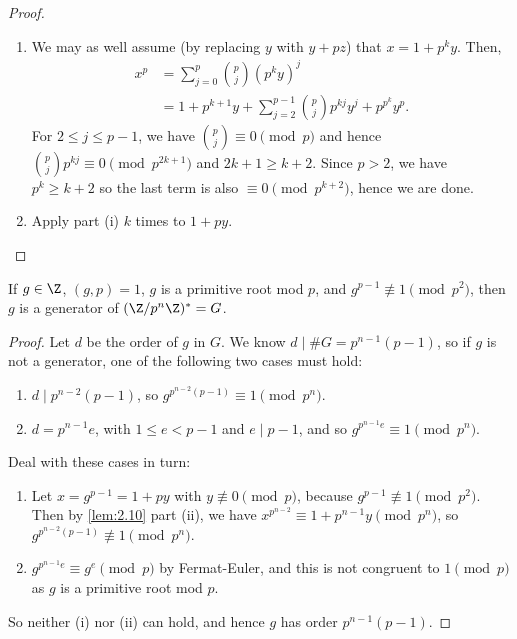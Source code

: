 \documentclass{article}
\begin{document}
\begin{proof}
    \leavevmode
    \begin{enumerate}[label=(\roman*)]
        \item We may as well assume (by replacing $y$ with $y + pz$) that $x = 1 + p^k y$. Then,
            \begin{align*}
                x^p &= \sum_{j=0}^p \binom{p}{j} (p^k y)^j \\
                    &= 1 + p^{k+1} y + \sum_{j=2}^{p-1} \binom{p}{j} p^{kj} y^j + p^{p^k} y^p.
            \end{align*}
            For $2 \leq j \leq p-1$, we have $\binom{p}{j} \equiv 0 \pmod{p}$ and hence $\binom{p}{j} p^{kj} \equiv 0 \pmod{p^{2k+1}}$ and $2k+1 \geq k+2$.
            Since $p > 2$, we have $p^k \geq k+2$ so the last term is also $\equiv 0 \pmod{p^{k+2}}$, hence we are done.

        \item Apply part (i) $k$ times to $1 + py$.
    \end{enumerate}
\end{proof}

\begin{nlemma}\label{lem:2.11}
    If $g \in \Z$, $(g, p) = 1$, $g$ is a primitive root mod $p$, and $g^{p-1} \not\equiv 1 \pmod{p^2}$, then $g$ is a generator of $(\Z/p^n \Z)^* = G$.
\end{nlemma}

\begin{proof}
    Let $d$ be the order of $g$ in $G$. We know $d \mid \#G = p^{n-1}(p-1)$, so if $g$ is not a generator, one of the following two cases must hold:

    \begin{enumerate}[label=(\roman*)]
        \item $d \mid p^{n-2} (p-1)$, so $g^{p^{n-2}(p-1)} \equiv 1 \pmod{p^n}$.
        \item $d = p^{n-1} e$, with $1 \leq e < p-1$ and $e \mid p-1$, and so $g^{p^{n-1} e} \equiv 1 \pmod{p^n}$.
    \end{enumerate}
    Deal with these cases in turn:

    \begin{enumerate}[label=(\roman*)]
        \item Let $x = g^{p-1} = 1+py$ with $y \not\equiv 0 \pmod{p}$, because $g^{p-1} \not\equiv 1 \pmod{p^2}$.
            Then by \cref{lem:2.10} part (ii), we have $x^{p^{n-2}} \equiv 1 + p^{n-1} y \pmod{p^n}$, so $g^{p^{n-2}(p-1)} \not\equiv 1 \pmod{p^n}$.

        \item $g^{p^{n-1}e} \equiv g^e \pmod{p}$ by Fermat-Euler, and this is not congruent to $1 \pmod{p}$ as $g$ is a primitive root mod $p$.
    \end{enumerate}

    So neither (i) nor (ii) can hold, and hence $g$ has order $p^{n-1}(p-1)$.
\end{proof}
\end{document}
